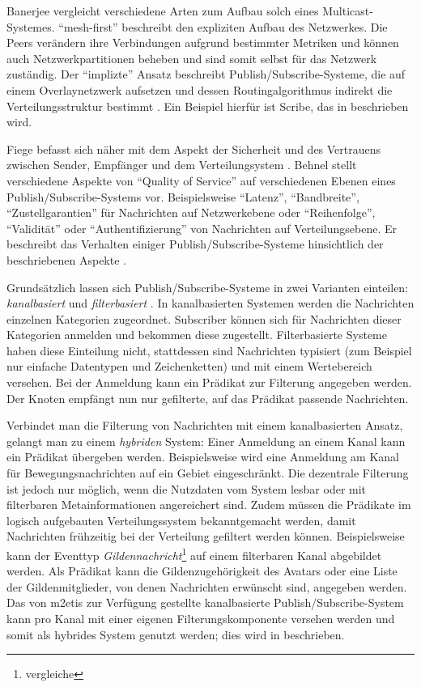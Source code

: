 Banerjee vergleicht verschiedene Arten zum Aufbau solch eines Multicast-Systemes. \enquote{mesh-first} beschreibt den expliziten Aufbau des Netzwerkes. Die Peers verändern ihre Verbindungen aufgrund bestimmter Metriken und können auch Netzwerkpartitionen beheben und sind somit selbst für das Netzwerk zuständig. Der \enquote{implizte} Ansatz beschreibt Publish/Subscribe-Systeme, die auf einem Overlaynetzwerk aufsetzen und dessen Routingalgorithmus indirekt die Verteilungsstruktur bestimmt \cite{Banerjee2001Comparative}. Ein Beispiel hierfür ist Scribe, das in  beschrieben wird.

Fiege befasst sich näher mit dem Aspekt der Sicherheit und des Vertrauens zwischen Sender, Empfänger und dem Verteilungsystem \cite{FiegeSecurity}. Behnel stellt verschiedene Aspekte von \enquote{Quality of Service} auf verschiedenen Ebenen eines Publish/Sub\-scribe-Systems vor. Beispielsweise \enquote{Latenz}, \enquote{Bandbreite}, \enquote{Zustellgarantien} für Nachrichten auf Netzwerkebene oder \enquote{Reihenfolge}, \enquote{Validität} oder \enquote{Authentifizierung} von Nachrichten auf Verteilungsebene. Er beschreibt das Verhalten einiger Publish/Subscribe-Systeme hinsichtlich der beschriebenen Aspekte \cite{BeFiMu2006PubSubQoS}. 

Grundsätzlich lassen sich Publish/Subscribe-Systeme in zwei Varianten einteilen: \emph{kanalbasiert} und \emph{filterbasiert} \cite{Liu2003Survey}. In kanalbasierten Systemen werden die Nachrichten einzelnen Kategorien zugeordnet. Subscriber können sich für Nachrichten dieser Kategorien anmelden und bekommen diese zugestellt. Filterbasierte Systeme haben diese Einteilung nicht, stattdessen sind Nachrichten typisiert (zum Beispiel nur einfache Datentypen und Zeichenketten) und mit einem Wertebereich versehen. Bei der Anmeldung kann ein Prädikat zur Filterung angegeben werden. Der Knoten empfängt nun nur gefilterte, auf das Prädikat passende Nachrichten.

Verbindet man die Filterung von Nachrichten mit einem kanalbasierten Ansatz, gelangt man zu einem \emph{hybriden} System: Einer Anmeldung an einem Kanal kann ein Prädikat übergeben werden. Beispielsweise wird eine Anmeldung am Kanal für Bewegungsnachrichten auf ein Gebiet eingeschränkt. Die dezentrale Filterung ist jedoch nur möglich, wenn die Nutzdaten vom System lesbar oder mit filterbaren Metainformationen angereichert sind. Zudem müssen die Prädikate im logisch aufgebauten Verteilungssystem bekanntgemacht werden, damit Nachrichten frühzeitig bei der Verteilung gefiltert werden können. Beispielsweise kann der Eventtyp \emph{Gildennachricht}\footnote{vergleiche } auf einem filterbaren Kanal abgebildet werden. Als Prädikat kann die Gildenzugehörigkeit des Avatars oder eine Liste der Gildenmitglieder, von denen Nachrichten erwünscht sind, angegeben werden.\\
Das von \ac{m2etis} zur Verfügung gestellte kanalbasierte Publish/Subscribe-System kann pro Kanal mit einer eigenen Filterungskomponente versehen werden und somit als hybrides System genutzt werden; dies wird in  beschrieben.

